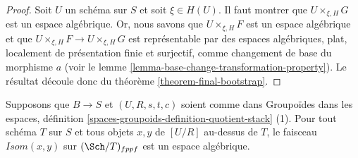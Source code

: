 \begin{proof}
Soit $U$ un schéma sur $S$ et soit $\xi \in H(U)$. Il faut montrer que
$U \times_{\xi, H} G$ est un espace algébrique. Or, nous savons
que $U \times_{\xi, H} F$ est un espace algébrique et que
$U \times_{\xi, H} F \to U \times_{\xi, H} G$ est représentable par
des espaces algébriques, plat, localement de présentation finie et surjectif,
comme changement de base du morphisme $a$ (voir le
lemme \ref{lemma-base-change-transformation-property}).
Le résultat découle donc du théorème \ref{theorem-final-bootstrap}.
\end{proof}

\begin{lemma}
\label{lemma-quotient-stack-isom}
Supposons que $B \to S$ et $(U, R, s, t, c)$ soient comme dans
Groupoïdes dans les espaces,
définition \ref{spaces-groupoids-definition-quotient-stack} (1).
Pour tout schéma $T$ sur $S$ et tous objets $x, y$ de $[U/R]$ au-dessus de $T$,
le faisceau $\mathit{Isom}(x, y)$ sur $(\Sch/T)_{fppf}$
est un espace algébrique.
\end{lemma}


